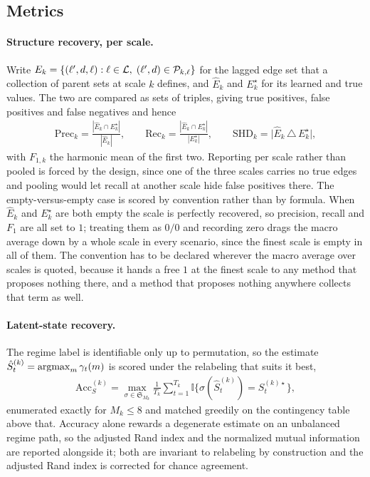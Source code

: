 \subsection{Metrics}
\label{sec:benchmark_metrics}

\paragraph{Structure recovery, per scale.}
Write
\(E_k = \{(\ell', d, \ell) : \ell \in {\mathcal{L}},\; (\ell', d) \in {\mathcal{P}}_{k,\ell}\}\)
for the lagged edge set that a collection of parent sets at scale \(k\)
defines, and
\(\hat{E}_k\) and \(E_k^\star\) for its learned and true values. The two are
compared as sets of triples, giving true positives, false positives and false
negatives and hence
\begin{align}
\mathrm{Prec}_k = \frac{|\hat{E}_k \cap E_k^\star|}{|\hat{E}_k|},
\qquad
\mathrm{Rec}_k = \frac{|\hat{E}_k \cap E_k^\star|}{|E_k^\star|},
\qquad
\mathrm{SHD}_k = \bigl|\hat{E}_k \,\triangle\, E_k^\star\bigr| ,
\label{eq:bench_structure}
\end{align}
with \(F_{1,k}\) the harmonic mean of the first two. Reporting per scale rather
than pooled is forced by the design, since one of the three scales carries no
true edges and pooling would let recall at another scale hide false positives
there. The empty-versus-empty case is scored by convention rather than by
formula. When \(\hat{E}_k\) and \(E_k^\star\) are both empty the scale is
perfectly recovered, so precision, recall and \(F_1\) are all set to \(1\);
treating them as \(0/0\) and recording zero drags the macro average down by a
whole scale in every scenario, since the finest scale is empty in all of them.
The convention has to be declared wherever the macro average over scales is
quoted, because it hands a free \(1\) at the finest scale to any method that
proposes nothing there, and a method that proposes nothing anywhere collects
that term as well.

\paragraph{Latent-state recovery.}
The regime label is identifiable only up to permutation, so the estimate
\(\hat{S}_t^{(k)} = \operatorname*{argmax}_m \gamma_t(m)\) is scored under the relabeling that
suits it best,
\begin{align}
\mathrm{Acc}_S^{(k)}
=
\max_{\sigma \in \mathfrak{S}_{M_k}}
\frac{1}{T_k}\sum_{t=1}^{T_k}
\mathbb{I}\bigl\{\sigma(\hat{S}_t^{(k)}) = S_t^{(k)\star}\bigr\},
\label{eq:bench_accs}
\end{align}
enumerated exactly for \(M_k \le 8\) and matched greedily on the contingency
table above that. Accuracy alone rewards a degenerate estimate on an unbalanced
regime path, so the adjusted Rand index and the normalized mutual information
are reported alongside it; both are invariant to relabeling by construction and
the adjusted Rand index is corrected for chance agreement.

